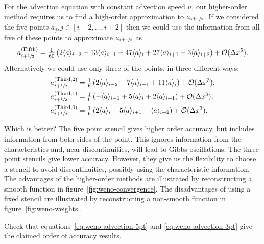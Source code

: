 For the advection equation with constant advection speed $u$, our higher-order
method requires us to find a high-order approximation to $a_{i+{\sfrac{1}{2}}}$. If we
considered the five points $a_{j}, j \in [i-2, \dots, i+2]$ then we could use
the information from all five of these points to approximate $a_{i+{\sfrac{1}{2}}}$ as
\begin{equation}
  \label{eq:weno-advection-5pt}
  a^{(\text{Fifth})}_{i+{\sfrac{1}{2}}} = \tfrac{1}{60} \left( 2 \langle a \rangle_{i-2} - 13 \langle a \rangle_{i-1} + 47 \langle a \rangle_{i} + 27 \langle a \rangle_{i+1} - 3 \langle a \rangle_{i+2} \right) + {\cal O}(\Delta x^5).
\end{equation}
Alternatively we could use only three of the points, in three different ways:
\begin{subequations}
  \label{eq:weno-advection-3pt}
  \begin{align}
    a^{(\text{Third}, 2)}_{i+{\sfrac{1}{2}}} &= \tfrac{1}{6} \left( 2 \langle a \rangle_{i-2} - 7 \langle a \rangle_{i-1} + 11 \langle a \rangle_{i} \right) + {\cal O}(\Delta x^3), \\
    a^{(\text{Third}, 1)}_{i+{\sfrac{1}{2}}} &= \tfrac{1}{6} \left( - \langle a \rangle_{i-1} + 5 \langle a \rangle_{i} + 2 \langle a \rangle_{i+1} \right) + {\cal O}(\Delta x^3), \\
    a^{(\text{Third}, 0)}_{i+{\sfrac{1}{2}}} &= \tfrac{1}{6} \left( 2 \langle a \rangle_{i} + 5 \langle a \rangle_{i+1} - \langle a \rangle_{i+2} \right) + {\cal O}(\Delta x^3).
  \end{align}
\end{subequations}

Which is better? The five point stencil gives higher order accuracy, but
includes information from both sides of the point. This ignores information from
the characteristics and, near discontinuities, will lead to Gibbs oscillations.
The three point stencils give lower accuracy. However, they give us the
flexibility to choose a stencil to avoid discontinuities, possibly using the
characteristic information. The advantages of the higher-order methods are illustrated by reconstructing a smooth function in figure~\ref{fig:weno-convergence}. The disadvantages of using a fixed stencil are illustrated by reconstructing a non-smooth function in figure~\ref{fig:weno-weights}.


\begin{exercise}
{Check that equations~\eqref{eq:weno-advection-5pt} and
\eqref{eq:weno-advection-3pt} give the claimed order of accuracy results.}
\end{exercise}


